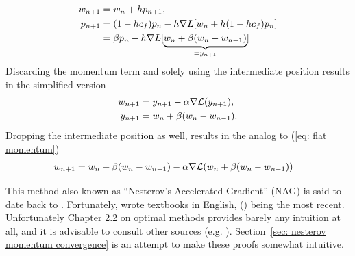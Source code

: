 %
\begin{definition}
	\label{def: nesterov's momentum}
	\begin{subequations}
	\begin{align}
		w_{n+1} &= w_n + h p_{n+1},
		\label{eq: nesterov momentum move}\\
		p_{n+1}
		&= (1-hc_f)p_n
		- h\nabla L[w_n + h(1-hc_f)p_n]
		\label{eq: nesterov momentum}
		\\ \nonumber
		&= \beta p_n
		- h\nabla L[\underbrace{
			w_n + \beta(w_n - w_{n-1})
		}_{= y_{n+1}}]
	\end{align}
	\end{subequations}
	Discarding the momentum term and solely using the intermediate position
	results in the simplified version
	\begin{subequations} \label{eq: nesterov intermediate position version}
	\begin{align}
		w_{n+1} &= y_{n+1} - \alpha \nabla \mathcal{L}(y_{n+1}),\\
		y_{n+1}&= w_n + \beta(w_n - w_{n-1}).
	\end{align}
	\end{subequations}
	Dropping the intermediate position as well, results in the analog to (\ref{eq:
	flat momentum})
	\begin{align}
		w_{n+1} &= w_n + \beta(w_n - w_{n-1})
		- \alpha \nabla \mathcal{L}(w_n + \beta(w_n - w_{n-1}))
	\end{align}
\end{definition}
%
\begin{remark}
	This method also known as ``Nesterov's Accelerated Gradient'' (NAG) is said
	to date back to \textcite[in Russian]{nesterovMethodSolvingConvex1983}.
	Fortunately, \citeauthor{nesterovMethodSolvingConvex1983} wrote textbooks
	in English, 
	(\citeyear{nesterovLecturesConvexOptimization2018}) being the most recent.
	Unfortunately Chapter 2.2 on optimal methods provides barely any
	intuition at all, and it is advisable to consult other sources (e.g.
	\textcite{dontlooWhatDifferenceMomentum2016}). Section~\ref{sec: nesterov
	momentum convergence} is an attempt to make these proofs somewhat intuitive.
 \end{remark}

